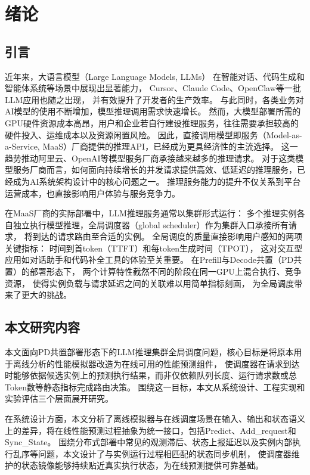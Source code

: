 
\chapter{绪论}
\label{ch:intro}

\section{引言}
近年来，大语言模型（Large Language Models, LLMs）
在智能对话、代码生成和智能体系统等场景中展现出显著能力，
Cursor、Claude Code、OpenClaw等一批LLM应用也随之出现，
并有效提升了开发者的生产效率。
与此同时，各类业务对AI模型的使用不断增加，模型推理调用需求快速增长。
然而，大模型部署所需的GPU硬件资源成本高昂，用户和企业若自行建设推理服务，往往需要承担较高的硬件投入、运维成本以及资源闲置风险。
因此，直接调用模型即服务（Model-as-a-Service, MaaS）厂商提供的推理API，已经成为更具经济性的主流选择。
这一趋势推动阿里云、OpenAI等模型服务厂商承接越来越多的推理请求。
对于这类模型服务厂商而言，如何面向持续增长的并发请求提供高效、低延迟的推理服务，已经成为AI系统架构设计中的核心问题之一。
推理服务能力的提升不仅关系到平台运营成本，也直接影响用户体验与服务竞争力。

在MaaS厂商的实际部署中，LLM推理服务通常以集群形式运行：
多个推理实例各自独立执行模型推理，全局调度器（global scheduler）作为集群入口承接所有请求，
将到达的请求路由至合适的实例。
全局调度的质量直接影响用户感知的两项关键指标：
时间到首token（TTFT）和每token生成时间（TPOT），
这对交互型应用如对话助手和代码补全工具的体验至关重要。
在Prefill与Decode共置（PD共置）的部署形态下，
两个计算特性截然不同的阶段在同一GPU上混合执行、竞争资源，
使得实例负载与请求延迟之间的关联难以用简单指标刻画，
为全局调度带来了更大的挑战。


\section{本文研究内容}
本文面向PD共置部署形态下的LLM推理集群全局调度问题，核心目标是将原本用于离线分析的性能模拟器改造为在线可用的性能预测组件，
使调度器在请求到达时能够依据候选实例上的预测执行结果，而非仅依赖队列长度、运行请求数或总Token数等静态指标完成路由决策。
围绕这一目标，本文从系统设计、工程实现和实验评估三个层面展开研究。

在系统设计方面，本文分析了离线模拟器与在线调度场景在输入、输出和状态语义上的差异，将在线性能预测过程抽象为统一接口，包括Predict、Add\_request和Sync\_State。
围绕分布式部署中常见的观测滞后、状态上报延迟以及实例内部执行乱序等问题，本文设计了与实例运行过程相匹配的状态同步机制，
使调度器维护的状态镜像能够持续贴近真实执行状态，为在线预测提供可靠基础。

